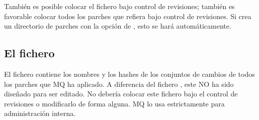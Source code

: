 También es posible colocar el fichero  bajo control
de revisiones;  también es favorable colocar todos los parches que refiera
bajo control de revisiones.  Si crea un directorio de parches con la
opción  de , esto se hará
automáticamente.

\subsection{El fichero }

El fichero  contiene los nombres y los hashes de los
conjuntos de cambios de todos los parches que MQ ha aplicado.  A
diferencia del fichero , este NO ha sido diseñado
para ser editado.  No debería colocar este fichero bajo el control de
revisiones o modificarlo de forma alguna.  MQ lo usa estrictamente
para administración interna.

